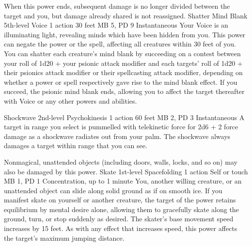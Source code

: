 When this power ends, subsequent damage is no longer divided
between the target and you, but damage already shared is not
reassigned.
\DndPowerHeader%
    {Shatter Mind Blank\label{pwr:shatter_mind_blank}}
    {5th-level Voice}
    {1 action}
    {30 feet}
    {MB 5, PD 9}
    {Instantaneous}
Your Voice is an illuminating light, revealing
minds which have been hidden from you. This power can negate
the  power or the 
spell, affecting all creatures within 30 feet of you. You
can shatter each creature's mind blank by succeeding on a
contest between your roll of 1d20 + your psionic attack modifier
and each targets' roll of 1d20 + their psionics attack modifier
or their spellcasting attack modifier, depending on whether
a power or spell respectively gave rise to the mind blank
effect. If you succeed, the psionic mind blank ends, allowing
you to affect the target thereafter with Voice or any other
powers and abilities.

\DndPowerHeader%
    {Shockwave\label{pwr:shockwave}}
    {2nd-level Psychokinesis}
    {1 action}
    {60 feet}
    {MB 2, PD 3}
    {Instantaneous}
A target in range you select is pummelled
with telekinetic force for 2d6 + 2 force damage as a shockwave
radiates out from your palm. The shockwave always damages
a target within range that you can see.

Nonmagical, unattended objects (including doors, walls, locks,
and so on) may also be damaged by this power.
\DndPowerHeader%
    {Skate\label{pwr:skate}}
    {1st-level Spacefolding}
    {1 action}
    {Self or touch}
    {MB 1, PD 1}
    {Concentration, up to 1 minute}
You, another willing creature, or an unattended
object can slide along solid ground as if on smooth ice. If
you manifest skate on yourself or another creature, the target
of the power retains equilibrium by mental desire alone, allowing
them to gracefully skate along the ground, turn, or stop suddenly
as desired. The skater's base movement speed increases by
15 feet. As with any effect that increases speed, this power
affects the target's maximum jumping distance.

